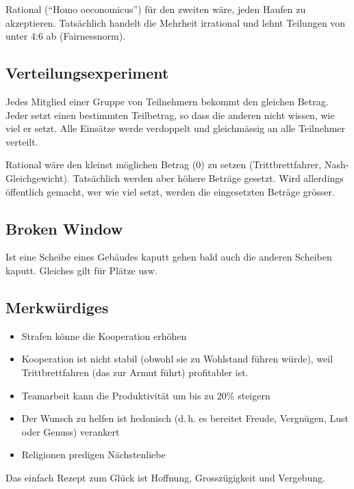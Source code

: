 Rational (\enquote{Homo oeconomicus}) für den zweiten wäre, jeden Haufen zu akzeptieren. Tatsächlich handelt die Mehrheit 
irrational und lehnt Teilungen von unter 4:6 ab (Fairnessnorm).

\subsection{Verteilungsexperiment}
Jedes Mitglied einer Gruppe von Teilnehmern bekommt den gleichen Betrag. Jeder setzt einen bestimmten Teilbetrag, so dass
die anderen nicht wissen, wie viel er setzt. Alle Einsätze werde verdoppelt und gleichmässig an alle Teilnehmer verteilt.

Rational wäre den kleinst möglichen Betrag (0) zu setzen (Trittbrettfahrer, Nash-Gleichgewicht). Tatsächlich werden aber
höhere Beträge gesetzt. Wird allerdings öffentlich gemacht, wer wie viel setzt, werden die eingesetzten Beträge grösser.

\subsection{Broken Window}
Ist eine Scheibe eines Gebäudes kaputt gehen bald auch die anderen Scheiben kaputt. Gleiches gilt für Plätze usw.

\subsection{Merkwürdiges}
\begin{itemize}\itemsep0em
	\item Strafen könne die Kooperation erhöhen
	\item Kooperation ist nicht stabil (obwohl sie zu Wohlstand führen würde), weil Trittbrettfahren (das zur Armut führt) profitabler ist.
	\item Teamarbeit kann die Produktivität um bis zu 20\% steigern
	\item Der Wunsch zu helfen ist hedonisch (d.\,h. es bereitet Freude, Vergnügen, Lust oder Genuss) verankert
	\item Religionen predigen Nächstenliebe
\end{itemize}
 
Das einfach Rezept zum Glück ist Hoffnung, Grosszügigkeit und Vergebung.
